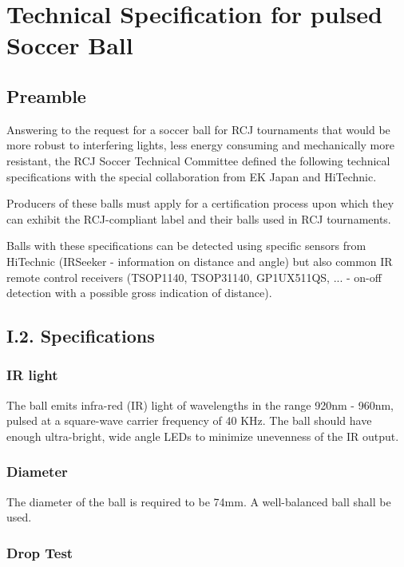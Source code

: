 \documentclass{article}
\begin{document}
\appendix
\section{Technical Specification for pulsed Soccer Ball\label{ref-pulsed-spec}}

\subsection{Preamble}

Answering to the request for a soccer ball for RCJ tournaments that would be more robust to interfering lights, less energy consuming and mechanically more resistant, the RCJ Soccer Technical Committee defined the following technical specifications with the special collaboration from EK Japan and HiTechnic.

Producers of these balls must apply for a certification process upon which they can exhibit the RCJ-compliant label and their balls used in RCJ tournaments.

Balls with these specifications can be detected using specific sensors from HiTechnic (IRSeeker - information on distance and angle) but also common IR remote control receivers (TSOP1140, TSOP31140, GP1UX511QS, ... - on-off detection with a possible gross indication of distance).

\subsection{I.2. Specifications}

\subsubsection{IR light}

The ball emits infra-red (IR) light of wavelengths in the range 920nm - 960nm, pulsed at a square-wave carrier frequency of 40 KHz. The ball should have enough ultra-bright, wide angle LEDs to minimize unevenness of the IR output.

\subsubsection{Diameter}

The diameter of the ball is required to be 74mm. A well-balanced ball shall be used.

\subsubsection{Drop Test}
\end{document}
